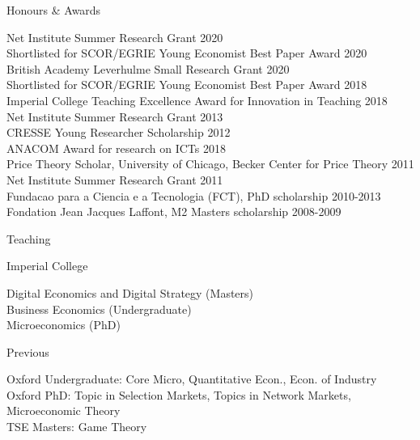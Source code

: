 \documentclass{resume}
\begin{document}
\begin{rSection}{Honours \& Awards}

Net Institute Summer Research Grant \hfill {2020}
\\ Shortlisted for SCOR/EGRIE Young Economist Best Paper Award \hfill 2020
\\ British Academy Leverhulme Small Research Grant \hfill 2020
\\ Shortlisted for SCOR/EGRIE Young Economist Best Paper Award \hfill 2018
\\Imperial College Teaching Excellence Award for Innovation in Teaching \hfill 2018
\\ Net Institute Summer Research Grant \hfill {2013}
\\ CRESSE Young Researcher Scholarship \hfill {2012}
\\ ANACOM Award for research on ICTs \hfill {2018}
\\ Price Theory Scholar, University of Chicago, Becker Center for Price Theory \hfill {2011}
\\ Net Institute Summer Research Grant \hfill {2011}
\\ Fundacao para a Ciencia e a Tecnologia (FCT), PhD scholarship \hfill {2010-2013}
\\ Fondation Jean Jacques Laffont, M2 Masters scholarship \hfill 2008-2009

\end{rSection}






\begin{rSection}{Teaching}

\begin{rSubsection}{Imperial College}{}{}

Digital Economics and Digital Strategy (Masters)
\\ Business Economics (Undergraduate)
\\ Microeconomics (PhD)

\end{rSubsection}


\begin{rSubsection}{Previous}{}{}

Oxford Undergraduate: Core Micro, Quantitative Econ., Econ. of Industry \\
Oxford PhD: Topic in Selection Markets, Topics in Network Markets, Microeconomic Theory \\
TSE Masters: Game Theory	
\end{rSubsection}


	
\end{rSection}
\end{document}
